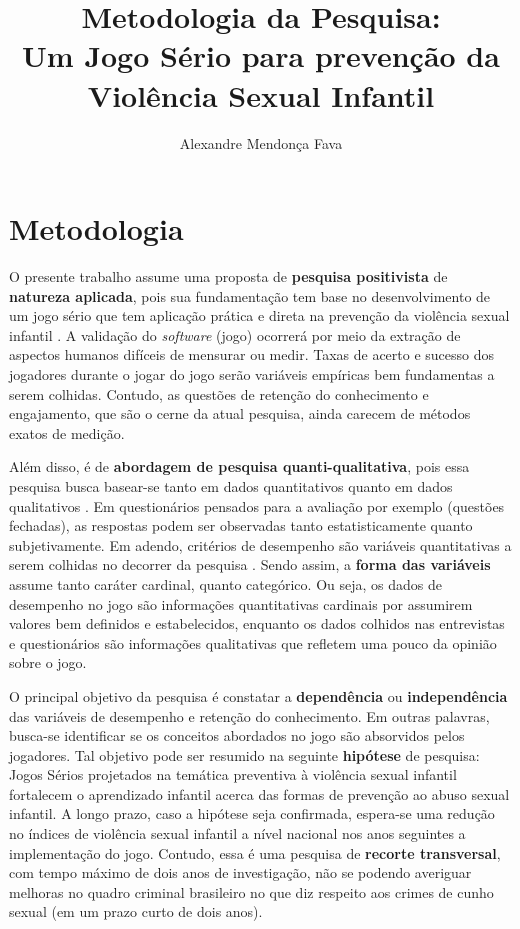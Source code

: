 \documentclass[12pt]{article}
\title{Metodologia da Pesquisa: \\Um Jogo Sério para prevenção da Violência Sexual Infantil}
\author{Alexandre Mendonça Fava\inst{1}}
\begin{document}
 

\maketitle

\vspace{1cm}

\section{Metodologia}\label{secao:introducao}

O presente trabalho assume uma proposta de \textbf{pesquisa positivista} de \textbf{natureza aplicada}, pois sua fundamentação tem base no desenvolvimento de um jogo sério que tem aplicação prática e direta na prevenção da violência sexual infantil \cite{lacerda2009augusto}. A validação do \textit{software} (jogo) ocorrerá por meio da extração de aspectos humanos difíceis de mensurar ou medir. Taxas de acerto e sucesso dos jogadores durante o jogar do jogo serão variáveis empíricas bem fundamentas a serem colhidas. Contudo, as questões de retenção do conhecimento e engajamento, que são o cerne da atual pesquisa, ainda carecem de métodos exatos de medição. 

Além disso, é de \textbf{abordagem de pesquisa quanti-qualitativa}, pois essa pesquisa busca basear-se tanto em dados quantitativos quanto em dados qualitativos \cite{ludke2011pesquisa}. Em questionários pensados para a avaliação por exemplo (questões fechadas), as respostas podem ser observadas tanto estatisticamente quanto subjetivamente. Em adendo, critérios de desempenho são variáveis quantitativas a serem colhidas no decorrer da pesquisa \cite{souza2017abordagem}. Sendo assim, a \textbf{forma das variáveis} assume tanto caráter cardinal, quanto categórico. Ou seja, os dados de desempenho no jogo são informações quantitativas cardinais por assumirem valores bem definidos e estabelecidos, enquanto os dados colhidos nas entrevistas e questionários são informações qualitativas que refletem uma pouco da opinião sobre o jogo.

O principal objetivo da pesquisa é constatar a \textbf{dependência} ou \textbf{independência} das variáveis de desempenho e retenção do conhecimento. Em outras palavras, busca-se identificar se os conceitos abordados no jogo são absorvidos pelos jogadores. Tal objetivo pode ser resumido na seguinte \textbf{hipótese} de pesquisa: Jogos Sérios projetados na temática preventiva à violência sexual infantil fortalecem o aprendizado infantil acerca das formas de prevenção ao abuso sexual infantil. A longo prazo, caso a hipótese seja confirmada, espera-se uma redução no índices de violência sexual infantil a nível nacional nos anos seguintes a implementação do jogo. Contudo, essa é uma pesquisa de \textbf{recorte transversal}, com tempo máximo de dois anos de investigação, não se podendo averiguar melhoras no quadro criminal brasileiro no que diz respeito aos crimes de cunho sexual (em um prazo curto de dois anos). 
\end{document}
